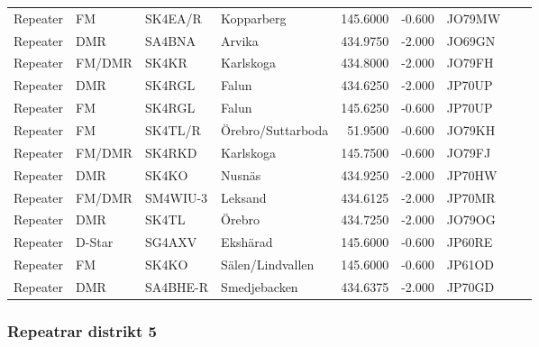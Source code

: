 \begin{longtable}{llllrrlcl}
	Repeater & FM         & SK4EA/R  & Kopparberg                 &   145.6000 &   -0.600 & JO79MW &  &  \\
	Repeater & DMR        & SA4BNA   & Arvika                     &   434.9750 &   -2.000 & JO69GN &  &  \\
	Repeater & FM/DMR     & SK4KR    & Karlskoga                  &   434.8000 &   -2.000 & JO79FH &  &  \\
	Repeater & DMR        & SK4RGL   & Falun                      &   434.6250 &   -2.000 & JP70UP &  &  \\
	Repeater & FM         & SK4RGL   & Falun                      &   145.6250 &   -0.600 & JP70UP &  &  \\
	Repeater & FM         & SK4TL/R  & Örebro/Suttarboda          &    51.9500 &   -0.600 & JO79KH &  &  \\
	Repeater & FM/DMR     & SK4RKD   & Karlskoga                  &   145.7500 &   -0.600 & JO79FJ &  &  \\
	Repeater & DMR        & SK4KO    & Nusnäs                     &   434.9250 &   -2.000 & JP70HW &  &  \\
	Repeater & FM/DMR     & SM4WIU-3 & Leksand                    &   434.6125 &   -2.000 & JP70MR &  &  \\
	Repeater & DMR        & SK4TL    & Örebro                     &   434.7250 &   -2.000 & JO79OG &  &  \\
	Repeater & D-Star     & SG4AXV   & Ekshärad                   &   145.6000 &   -0.600 & JP60RE &  &  \\
	Repeater & FM         & SK4KO    & Sälen/Lindvallen           &   145.6000 &   -0.600 & JP61OD &  &  \\
	Repeater & DMR        & SA4BHE-R & Smedjebacken               &   434.6375 &   -2.000 & JP70GD &  &
\end{longtable}

\subsubsection{Repeatrar distrikt 5}

